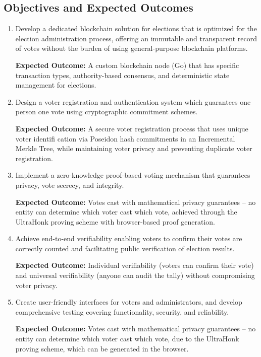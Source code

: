 \documentclass[12pt, a4paper]{report}
\begin{document}
\subsection{Objectives and Expected Outcomes}
\begin{enumerate}
    \item Develop a dedicated blockchain solution for elections that is optimized for the election administration process, offering an immutable and transparent record of votes without the burden of using general-purpose blockchain platforms.
    
    \textbf{Expected Outcome:} A custom blockchain node (Go) that has specific transaction types, authority-based consensus, and deterministic state management for elections.

    \item Design a voter registration and authentication system which guarantees one person one vote using cryptographic commitment schemes.
    
    \textbf{Expected Outcome:} A secure voter registration process that uses unique voter identifi cation via Poseidon hash commitments in an Incremental Merkle Tree, while maintaining voter privacy and preventing duplicate voter registration.

    \item Implement a zero-knowledge proof-based voting mechanism that guarantees privacy, vote secrecy, and integrity.

    \textbf{Expected Outcome:} Votes cast with mathematical privacy guarantees – no entity can determine which voter cast which vote, achieved through the UltraHonk proving scheme with browser-based proof generation.

    \item Achieve end-to-end verifiability enabling voters to confirm their votes are correctly counted and facilitating public verification of election results.

    \textbf{Expected Outcome:} Individual verifiability (voters can confirm their vote) and universal verifiability (anyone can audit the tally) without compromising voter privacy.

    \item Create user-friendly interfaces for voters and administrators, and develop comprehensive testing covering functionality, security, and reliability.

    \textbf{Expected Outcome:} Votes cast with mathematical privacy guarantees – no entity can determine which voter cast which vote, due to the UltraHonk proving scheme, which can be generated in the browser.
\end{enumerate}
\end{document}
